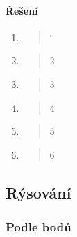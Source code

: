 \newpage
\paragraph{Řešení}
\begin{enumerate}
	\item
	\begin{quote}
		`
	\end{quote}

	\item
	\begin{quote}
		2
	\end{quote}
	
	\item
	\begin{quote}
		3
	\end{quote}
	
	\item
	\begin{quote}
		4
	\end{quote}
	
	\item
	\begin{quote}
		5
	\end{quote}
	
	\item
	\begin{quote}
		6
	\end{quote}
\end{enumerate}

\newpage

\subsection{Rýsování}
\label{subsec:rysovani}

\subsubsection{Podle bodů}

